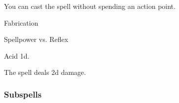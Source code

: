 You can cast the spell without spending an action point.




\newpage
\begin{spellsection}{Fabrication}

\begin{spellheader}
\end{spellheader}

\begin{spellcontent}

\begin{spelltargetinginfo}




\end{spelltargetinginfo}


\begin{spelleffects}




\begin{spellattack}{Spellpower vs. Reflex}


\spellsuccess
Acid  \plus1d.



\end{spellattack}





\end{spelleffects}

\end{spellcontent}
\begin{spellfooter}


\end{spellfooter}
\begin{spellsubcontent}


\begin{spellcantrip}
The spell deals \minus2d damage.
\end{spellcantrip}


\end{spellsubcontent}
\end{spellsection}


\subsubsection{Subspells}


